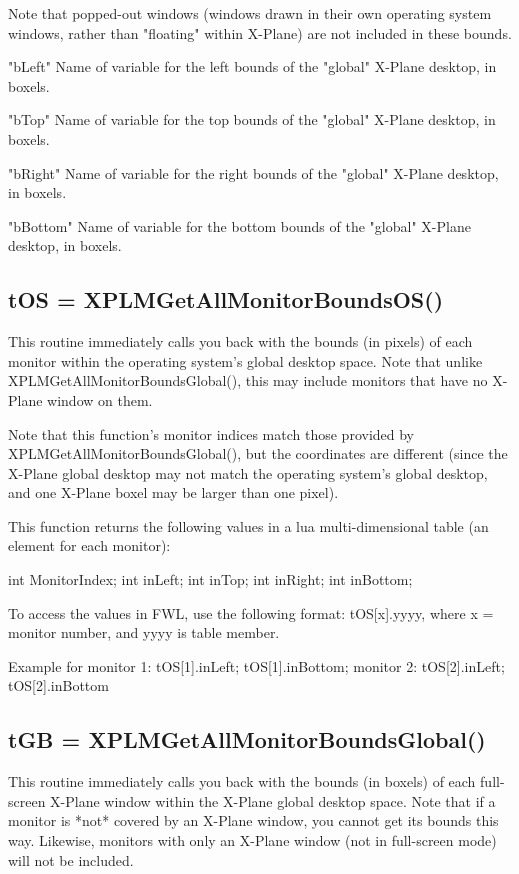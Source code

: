 \documentclass[11pt,parskip=half,a4paper]{scrartcl}
\begin{document}
Note that popped-out windows (windows drawn in their own operating system windows, rather than "floating" within X-Plane) are not included in these bounds.

"bLeft" Name of variable for the left bounds of the "global" X-Plane desktop, in boxels.

"bTop" Name of variable for the top bounds of the "global" X-Plane desktop, in boxels.

"bRight" Name of variable for the right bounds of the "global" X-Plane desktop, in boxels.

"bBottom" Name of variable for the bottom bounds of the "global" X-Plane desktop, in boxels.

\newpage

\subsection{\hspace*{1.0mm}tOS = XPLMGetAllMonitorBoundsOS()}

This routine immediately calls you back with the bounds (in pixels) of each monitor within the operating system's global desktop space. Note that unlike XPLMGetAllMonitorBoundsGlobal(), this may include monitors that have no X-Plane window on them.

Note that this function's monitor indices match those provided by XPLMGetAllMonitorBoundsGlobal(), but the coordinates are different (since the X-Plane global desktop may not match the operating system's global desktop, and one X-Plane boxel may be larger than one pixel).

This function returns the following values in a lua multi-dimensional table (an element for each monitor):

    int        MonitorIndex;
    int        inLeft;
    int        inTop;
    int        inRight;
    int        inBottom;
 

To access the values in FWL, use the following format: tOS[x].yyyy, where x = monitor number, and yyyy is table member.

Example for monitor 1: tOS[1].inLeft; tOS[1].inBottom; monitor 2: tOS[2].inLeft; tOS[2].inBottom 

\subsection{\hspace*{1.0mm}tGB = XPLMGetAllMonitorBoundsGlobal()}

This routine immediately calls you back with the bounds (in boxels) of each full-screen X-Plane window within the X-Plane global desktop space. Note that if a monitor is *not* covered by an X-Plane window, you cannot get its bounds this way. Likewise, monitors with only an X-Plane window (not in full-screen mode) will not be included.
\end{document}
